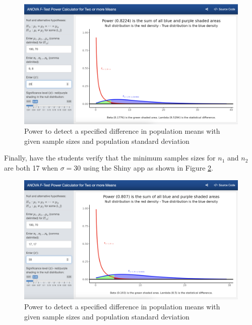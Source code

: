 \documentclass[
]{article}
\begin{document}
\begin{figure}

{\centering \includegraphics[width=5.93in]{./pics/fig-power2a} 

}

\caption{Power to detect a specified difference in population means with given sample sizes and population standard deviation}\label{fig:power2}
\end{figure}

Finally, have the students verify that the minimum samples sizes for \(n_1\) and \(n_2\) are both 17 when \(\sigma = 30\) using the Shiny app as shown in Figure \ref{fig:power3}.

\begin{figure}

{\centering \includegraphics[width=5.93in]{./pics/fig-power3a} 

}

\caption{Power to detect a specified difference in population means with given sample sizes and population standard deviation}\label{fig:power3}
\end{figure}
\end{document}

